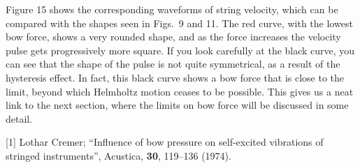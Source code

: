 
  Figure 15 shows the corresponding waveforms of string velocity, which can be 
  compared with the shapes seen in Figs.\ 9 and 11. The red curve, with the 
  lowest bow force, shows a very rounded shape, and as the force increases the 
  velocity pulse gets progressively more square. If you look carefully at the 
  black curve, you can see that the shape of the pulse is not quite 
  symmetrical, as a result of the hysteresis effect. In fact, this black curve 
  shows a bow force that is close to the limit, beyond which Helmholtz motion 
  ceases to be possible. This gives us a neat link to the next section, where 
  the limits on bow force will be discussed in some detail. 




  \sectionreferences{}[1] Lothar Cremer; ``Influence of bow pressure on 
  self-excited vibrations of stringed instruments'', Acustica, \textbf{30}, 
  119--136 (1974). 